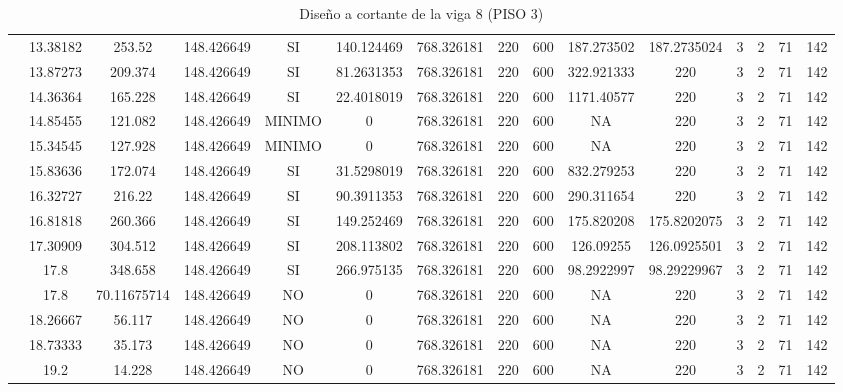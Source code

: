\begin{table}[H]
{\begin{tabular}{|c|c|c|c|c|c|c|c|c|c|c|c|c|c|c|}
\cline{2-15}    & 13.38182 & 253.52 & 148.426649 & SI  & 140.124469 & 768.326181 & 220 & 600 & 187.273502 & 187.2735024 & 3   & 2   & 71  & 142 \bigstrut\\
\cline{2-15}    & 13.87273 & 209.374 & 148.426649 & SI  & 81.2631353 & 768.326181 & 220 & 600 & 322.921333 & 220 & 3   & 2   & 71  & 142 \bigstrut\\
\cline{2-15}    & 14.36364 & 165.228 & 148.426649 & SI  & 22.4018019 & 768.326181 & 220 & 600 & 1171.40577 & 220 & 3   & 2   & 71  & 142 \bigstrut\\
\cline{2-15}    & 14.85455 & 121.082 & 148.426649 & MINIMO & 0   & 768.326181 & 220 & 600 & NA  & 220 & 3   & 2   & 71  & 142 \bigstrut\\
\cline{2-15}    & 15.34545 & 127.928 & 148.426649 & MINIMO & 0   & 768.326181 & 220 & 600 & NA  & 220 & 3   & 2   & 71  & 142 \bigstrut\\
\cline{2-15}    & 15.83636 & 172.074 & 148.426649 & SI  & 31.5298019 & 768.326181 & 220 & 600 & 832.279253 & 220 & 3   & 2   & 71  & 142 \bigstrut\\
\cline{2-15}    & 16.32727 & 216.22 & 148.426649 & SI  & 90.3911353 & 768.326181 & 220 & 600 & 290.311654 & 220 & 3   & 2   & 71  & 142 \bigstrut\\
\cline{2-15}    & 16.81818 & 260.366 & 148.426649 & SI  & 149.252469 & 768.326181 & 220 & 600 & 175.820208 & 175.8202075 & 3   & 2   & 71  & 142 \bigstrut\\
\cline{2-15}    & 17.30909 & 304.512 & 148.426649 & SI  & 208.113802 & 768.326181 & 220 & 600 & 126.09255 & 126.0925501 & 3   & 2   & 71  & 142 \bigstrut\\
\cline{2-15}    & 17.8 & 348.658 & 148.426649 & SI  & 266.975135 & 768.326181 & 220 & 600 & 98.2922997 & 98.29229967 & 3   & 2   & 71  & 142 \bigstrut\\
\cline{2-15}    & 17.8 & 70.11675714 & 148.426649 & NO  & 0   & 768.326181 & 220 & 600 & NA  & 220 & 3   & 2   & 71  & 142 \bigstrut\\
\cline{2-15}    & 18.26667 & 56.117 & 148.426649 & NO  & 0   & 768.326181 & 220 & 600 & NA  & 220 & 3   & 2   & 71  & 142 \bigstrut\\
\cline{2-15}    & 18.73333 & 35.173 & 148.426649 & NO  & 0   & 768.326181 & 220 & 600 & NA  & 220 & 3   & 2   & 71  & 142 \bigstrut\\
\cline{2-15}    & 19.2 & 14.228 & 148.426649 & NO  & 0   & 768.326181 & 220 & 600 & NA  & 220 & 3   & 2   & 71  & 142 \bigstrut\\
\hline
\end{tabular}%

  


  

  }%
    \caption{Diseño a cortante de la viga 8 (PISO 3) }
  \label{tab:C VG8 P3 }%
\end{table}%
